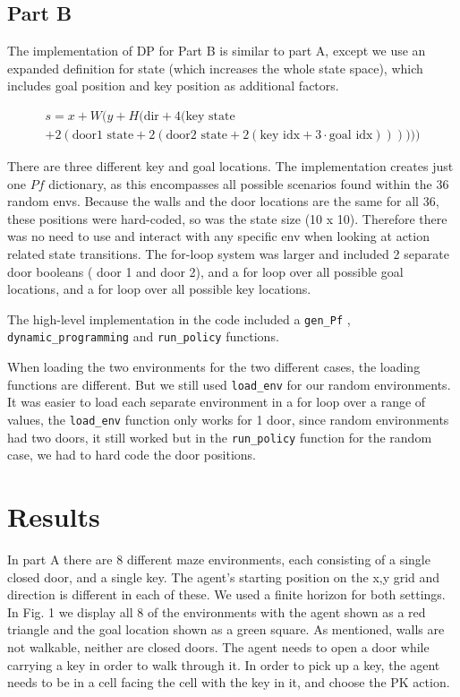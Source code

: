 \documentclass[conference]{IEEEtran}
\begin{document}
\subsection{Part B}
The implementation of DP for Part B is similar to part A, except we use an expanded definition for state (which increases the whole state space), which includes
goal position and key position as additional factors. 

\begin{multline}
s = x + W(y + H(\text{dir} + 4(\text{key state} \\
+ 2(\text{door1 state} + 2(\text{door2 state} + 2(\text{key idx} + 3 \cdot \text{goal idx}))))))
\end{multline}

There are three different key and goal locations. The implementation creates just one $Pf$ dictionary, as this encompasses all possible scenarios found within the 36 random envs. Because the walls and the door locations are the same
for all 36, these positions were hard-coded, so was the state size (10 x 10). Therefore there was no need to use and interact with any specific env when looking at action related
state transitions. The for-loop system was larger and included 2 separate door booleans ( door 1 and door 2), and a for loop over all possible goal locations, and a for loop
over all possible key locations.

The high-level implementation in the code included a \texttt{gen\_Pf} , \texttt{dynamic\_programming} and \texttt{run\_policy} functions.  

When loading the two environments for the two different cases, the loading functions are different. But we still used \texttt{load\_env} for our random environments. It was easier to
load each separate environment in a for loop over a range of values, the \texttt{load\_env} function only works for 1 door, since random environments had two doors, it still worked
but in the \texttt{run\_policy} function for the random case, we had to hard code the door positions.

\section{Results}
In part A there are 8 different maze environments, each consisting of a single closed door, and a single key. The agent's starting
position on the x,y grid and direction is different in each of these. We used a finite horizon for both settings. In Fig. 1 we display all 8 of the environments with the agent shown
as a red triangle and the goal location shown as a green square. As mentioned, walls are not walkable, neither are closed doors. The agent needs to open a door while carrying a key in order
to walk through it.
In order to pick up a key, the agent needs to be in a cell facing the cell with the key in it, and choose the PK action.   
\end{document}
